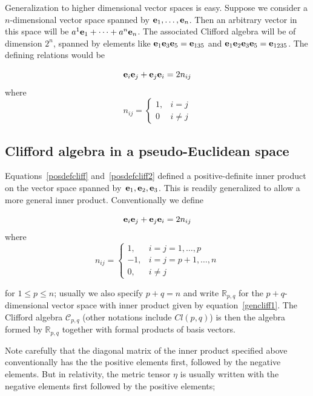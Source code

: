 \documentclass{article}
\begin{document}
Generalization to higher dimensional vector spaces is easy.  Suppose
we consider a $n$-dimensional vector space spanned by
${\bf e}_{1},\ldots,{\bf e}_{n}$.  Then an arbitrary vector in this space will
be $a^1{\bf e}_{1}+\cdots+a^n{\bf e}_{n}$.  The associated Clifford algebra will
be of dimension $2^n$, spanned by elements like
${\bf e}_{1}{\bf e}_{3}{\bf e}_{5}={\bf e}_{135}$ and
${\bf e}_{1}{\bf e}_{2}{\bf e}_{3}{\bf e}_{5}={\bf e}_{1235}$.  The defining relations would be

\begin{equation}\label{posdefcliff}
{\bf e}_{i}{\bf e}_{j}+{\bf e}_{j}{\bf e}_{i}=2n_{ij}
\end{equation}
where  
\begin{equation}\label{posdefcliff2}
  n_{ij} = \begin{cases}
    1, & i=j\\
    0 &i\neq j
  \end{cases}
\end{equation}



\subsection{Clifford algebra in a pseudo-Euclidean space}

Equations~\ref{posdefcliff} and~\ref{posdefcliff2} defined a
positive-definite inner product on the vector space spanned
by~${\bf e}_{1},{\bf e}_{2},{\bf e}_{3}$.  This is readily generalized to allow a
more general inner product.  Conventionally we define

\begin{equation}\label{gencliff1}
{\bf e}_{i}{\bf e}_{j}+{\bf e}_{j}{\bf e}_{i}=2n_{ij}
\end{equation}
where  
\begin{equation}\label{gencliff2}
  n_{ij} = \begin{cases}
    1, & i=j=1,\ldots,p\\
    -1, & i=j=p+1,\ldots,n\\
    0, &i\neq j
  \end{cases}
\end{equation}

for $1\leqslant p\leqslant n$; usually we also specify $p+q=n$ and
write $\mathbb{R}_{p,q}$ for the $p+q$-dimensional vector space with
inner product given by equation~\ref{gencliff1}.  The Clifford algebra
${\mathcal C}_{p,q}$ (other notations include $Cl(p,q)$) is then the
algebra formed by $\mathbb{R}_{p,q}$ together with formal products of
basis vectors.


Note carefully that the diagonal matrix of the inner product specified
above conventionally has the the positive elements first, followed by
the negative elements.  But in relativity, the metric tensor $\eta$ is
usually written with the negative elements first followed by the
positive elements;
\end{document}
